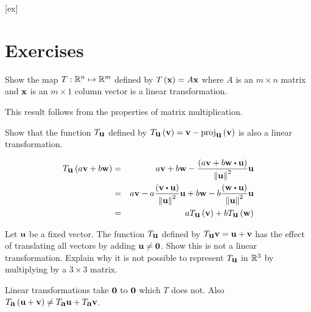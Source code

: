 [ex]
\section*{Exercises}

\begin{enumialphparenastyle}

\begin{ex} Show the map $T:\mathbb{R}^{n}\mapsto \mathbb{R}^{m}$ defined by 
$T\left(\mbox{\bf x} \right) =A\mbox{\bf x}$ where $A$ is an $m\times n$ matrix
and $\mbox{\bf x}$ is an $m\times 1$ column vector is a linear transformation. 
\begin{sol}
This result follows from the properties of matrix multiplication.
\end{sol}
\end{ex}

\begin{ex} Show that the function $T_{\mbox{\bf u}}$ defined by $T_{\mbox{\bf u}}
\left(\mbox{\bf v}\right) = \mbox{\bf v}-\mbox{\rm proj}_{\mbox{\bf u}}\left(
\mbox{\bf v}\right) $ is also a linear transformation.
\begin{sol}
\begin{eqnarray*}
T_{\vect{u}}\tup{a\vect{v}+b\vect{w}} &=&a\vect{v}+b\vect{w}-\frac{\tup{a\vect{v}+b\vect{w}\dotprod \vect{u}} }{\norm{\vect{u}
} ^{2}}\vect{u} \\
&=&a\vect{v}-a\frac{\tup{\vect{v}\dotprod \vect{u}} }{\norm{\vect{u}} ^{2}}\vect{u}+b\vect{w}-b\frac{\tup{\vect{w}\dotprod \vect{u}
} }{\norm{\vect{u}} ^{2}}\vect{u} \\
&=&aT_{\vect{u}}\tup{\vect{v}} +bT_{\vect{u}}\tup{\vect{w}
}
\end{eqnarray*}
\end{sol}
\end{ex}

\begin{ex} Let $\mbox{\bf u}$ be a fixed vector. The function 
$T_{\mbox{\bf u}}$ defined by $T_{\mbox{\bf u}}\mbox{\bf v}=\mbox{\bf u}+\mbox{\bf v}$ has the effect of
translating all vectors by adding $\mbox{\bf u}\neq \mbox{\bf 0}$. Show this is not a
linear transformation. Explain why it is not possible to represent 
$T_{\mbox{\bf u}}$ in $\mathbb{R}^{3}$ by multiplying by a $3\times 3$ matrix.
\begin{sol}
Linear
transformations take $\mbox{\bf 0}$ to $\mbox{\bf 0}$ which $T$ does not. Also $T_{\mbox{\bf a}}\left(\mbox{\bf u}+\mbox{\bf v}\right) \neq T_{\mbox{\bf a}}\mbox{\bf u}+T_{\mbox{\bf a}}
\mbox{\bf v}$.
\end{sol}
\end{ex}

\end{enumialphparenastyle}